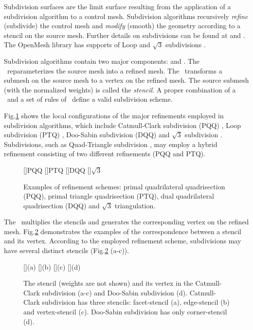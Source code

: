 Subdivision surfaces \cite{cc,ds,loop,sqrt3,qts}
are the limit surface resulting from the
application of a subdivision algorithm to a control mesh.
Subdivision algorithms recursively \emph{refine} (subdivide) the
control mesh and \emph{modify} (smooth) the geometry according
to a stencil on the source mesh.  
Further details on subdivisions can be found at \cite{Sub:course:2000}
and \cite{Warren:subdivision}. The OpenMesh library has
supports of Loop and $\sqrt{3}$ subdivisions \cite{Abhijit:2004:APISUB}.

Subdivision algorithms contain two major
components: \emph{\tr} and \emph{\gm}.
The \tr\ reparameterizes the source mesh into a refined 
mesh. The \gm\ transforms a submesh on the source mesh
to a vertex on the refined mesh. The source submesh (with
the normalized weights) is called the
\emph{stencil}. A proper combination of a \tr\ and a set of 
rules of \gm\ define a valid subdivision scheme.

Fig.\ref{fig:RefSchemes} shows the local configurations 
of the major refinements
employed in subdivision algorithms, which include Catmull-Clark
subdivision (PQQ) \cite{cc}, Loop subdivision (PTQ) \cite{loop},
Doo-Sabin subdivision (DQQ) \cite{ds} and $\sqrt{3}$ subdivision
\cite{sqrt3}. Subdivisions, such as Quad-Triangle subdivision 
\cite{qts,l-pg-03}, may employ a hybrid refinement consisting
of two different refinements (PQQ and PTQ).
\begin{figure}
  \centering
  []{\scriptsize PQQ} 
  []{\scriptsize PTQ}
  []{\scriptsize DQQ} 
  []{\scriptsize $\sqrt{3}$} 
  \caption{Examples of refinement schemes: 
    primal quadrilateral quadrisection (PQQ),
    primal triangle quadrisection (PTQ),
    dual quadrilateral quadrisection (DQQ) and
    $\sqrt{3}$ triangulation.}
  \label{fig:RefSchemes}
\end{figure}
The \gm\ multiplies the stencils and
generates the corresponding vertex on the refined mesh.
Fig.\ref{fig:RefMap} demonstrates the examples of the
correspondence between a stencil and its vertex. According 
to the employed refinement scheme, subdivisions 
may have several distinct stencils 
(Fig.\ref{fig:RefMap} (a-c)). 
\begin{figure}
  \centering
  []{(a)}
  []{(b)}
  []{(c)}
  []{(d)}
  \caption{The stencil (weights are not shown) and its 
           vertex in the Catmull-Clark subdivision (a-c)
           and Doo-Sabin subdivision (d). Catmull-Clark
           subdivision has three stencils: facet-stencil (a), 
           edge-stencil (b) and vertex-stencil (c). 
           Doo-Sabin subdivision has only corner-stencil (d).}
  \label{fig:RefMap}
\end{figure}


